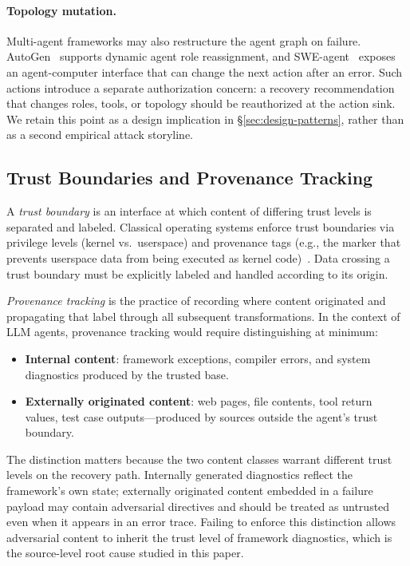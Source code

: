 \paragraph{Topology mutation.}
Multi-agent frameworks may also restructure the agent graph on failure.
AutoGen~\cite{autogen} supports dynamic agent role reassignment, and
SWE-agent~\cite{swe-agent} exposes an agent-computer interface that can
change the next action after an error. Such actions introduce a separate
authorization concern: a recovery recommendation that changes roles, tools, or
topology should be reauthorized at the action sink. We retain this point as a
design implication in \S\ref{sec:design-patterns}, rather than as a second
empirical attack storyline.

\subsection{Trust Boundaries and Provenance Tracking}
\label{sec:bg-trust}

A \emph{trust boundary} is an interface at which content of differing trust levels is separated and labeled. Classical operating systems enforce trust boundaries via privilege levels (kernel vs.\ userspace) and provenance tags (e.g., the  marker that prevents userspace data from being executed as kernel code)~\cite{saltzer1975protection,levine2003system}. Data crossing a trust boundary must be explicitly labeled and handled according to its origin.

\emph{Provenance tracking} is the practice of recording where content originated and propagating that label through all subsequent transformations. In the context of LLM agents, provenance tracking would require distinguishing at minimum:
\begin{itemize}[leftmargin=*]
    \item \textbf{Internal content}: framework exceptions, compiler errors, and system diagnostics produced by the trusted base.
    \item \textbf{Externally originated content}: web pages, file contents, tool return values, test case outputs---produced by sources outside the agent's trust boundary.
\end{itemize}

The distinction matters because the two content classes warrant different
trust levels on the recovery path. Internally generated diagnostics reflect
the framework's own state; externally originated content embedded in a failure
payload may contain adversarial directives and should be treated as untrusted
even when it appears in an error trace. Failing to enforce this distinction
allows adversarial content to inherit the trust level of framework diagnostics,
which is the source-level root cause studied in this paper.

